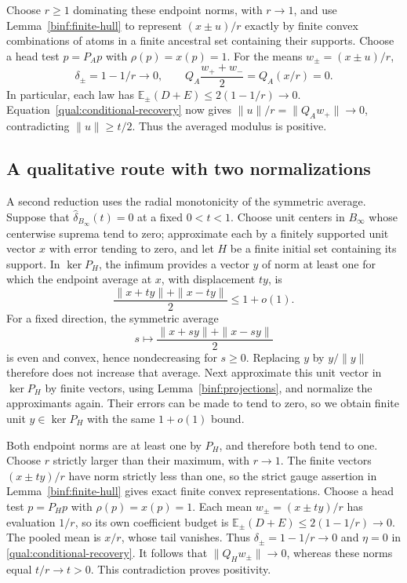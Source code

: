 Choose \(r\ge1\) dominating these endpoint norms, with \(r\to1\), and
use Lemma~\ref{binf:finite-hull} to represent \((x\pm u)/r\) exactly
by finite convex combinations of atoms in a finite ancestral set containing
their supports. Choose a head test \(p=P_Ap\) with
\(\rho(p)=x(p)=1\). For the means \(w_\pm=(x\pm u)/r\),
\[
 \delta_\pm=1-1/r\longrightarrow0,\qquad
 Q_A\frac{w_++w_-}{2}=Q_A(x/r)=0.
\]
In particular, each law has
\(\mathbb E_\pm(D+E)\le2(1-1/r)\to0\).
Equation~\eqref{qual:conditional-recovery} now gives
\(\|u\|/r=\|Q_Aw_+\|\to0\), contradicting
\(\|u\|\ge t/2\). Thus the averaged modulus is positive.

\subsection{A qualitative route with two normalizations}
\label{mold:qualitative-normalized}
A second reduction uses the radial monotonicity of the symmetric average.
Suppose that \(\widehat\delta_{B_\infty}(t)=0\) at a fixed
\(0<t<1\).  Choose unit centers in \(B_\infty\) whose
centerwise suprema tend to zero; approximate each by a finitely supported
unit vector \(x\) with error tending to zero, and let \(H\) be a finite
initial set containing its support.  In \(\ker P_H\), the infimum provides
a vector \(y\) of norm at least one for which the endpoint average at
\(x\), with displacement \(ty\), is
\[
 \frac{\|x+ty\|+\|x-ty\|}{2}\le1+o(1).
\]
For a fixed direction, the symmetric average
\[
 s\longmapsto\frac{\|x+sy\|+\|x-sy\|}{2}
\]
is even and convex, hence nondecreasing for \(s\ge0\).  Replacing \(y\)
by \(y/\|y\|\) therefore does not increase that average.  Next approximate
this unit vector in \(\ker P_H\) by finite vectors, using
Lemma~\ref{binf:projections}, and normalize the approximants again.
Their errors can be made to tend to zero, so we obtain
finite unit \(y\in\ker P_H\) with the same \(1+o(1)\) bound.

Both endpoint norms are at least one by \(P_H\), and therefore both tend
to one.  Choose \(r\) strictly larger than their maximum, with \(r\to1\).
The finite vectors \((x\pm ty)/r\) have norm strictly less than one, so
the strict gauge assertion in Lemma~\ref{binf:finite-hull} gives exact
finite convex representations. Choose a head test \(p=P_Hp\) with
\(\rho(p)=x(p)=1\). Each mean \(w_\pm=(x\pm ty)/r\) has evaluation
\(1/r\), so its own coefficient budget is
\(\mathbb E_\pm(D+E)\le2(1-1/r)\to0\).
The pooled mean is \(x/r\), whose tail vanishes. Thus
\(\delta_\pm=1-1/r\to0\) and \(\eta=0\) in
\eqref{qual:conditional-recovery}. It follows that
\(\|Q_Hw_\pm\|\to0\), whereas these norms equal \(t/r\to t>0\).
This contradiction proves positivity.

